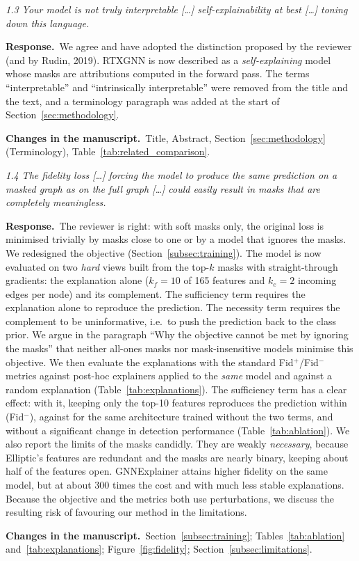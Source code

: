 \documentclass[11pt]{article}
\newenvironment{comment}{\par\medskip\noindent\begin{minipage}{\linewidth}\itshape\color{black!75}}{\end{minipage}\par\smallskip}
\newcommand{\resp}{\par\noindent\textbf{Response.}\ }
\newcommand{\change}{\par\noindent\textbf{Changes in the manuscript.}\ }
\begin{document}
\begin{comment}
1.3 Your model is not truly interpretable [\dots] self-explainability at best [\dots] toning down this language.
\end{comment}
\resp We agree and have adopted the distinction proposed by the reviewer (and by Rudin, 2019). RTXGNN is now described as a \emph{self-explaining} model whose masks are attributions computed in the forward pass. The terms ``interpretable'' and ``intrinsically interpretable'' were removed from the title and the text, and a terminology paragraph was added at the start of Section~\ref{sec:methodology}.
\change Title, Abstract, Section~\ref{sec:methodology} (Terminology), Table~\ref{tab:related_comparison}.

\begin{comment}
1.4 The fidelity loss [\dots] forcing the model to produce the same prediction on a masked graph as on the full graph [\dots] could easily result in masks that are completely meaningless.
\end{comment}
\resp The reviewer is right: with soft masks only, the original loss is minimised trivially by masks close to one or by a model that ignores the masks. We redesigned the objective (Section~\ref{subsec:training}). The model is now evaluated on two \emph{hard} views built from the top-$k$ masks with straight-through gradients: the explanation alone ($k_f=10$ of 165 features and $k_e=2$ incoming edges per node) and its complement. The sufficiency term requires the explanation alone to reproduce the prediction. The necessity term requires the complement to be uninformative, i.e.\ to push the prediction back to the class prior. We argue in the paragraph ``Why the objective cannot be met by ignoring the masks'' that neither all-ones masks nor mask-insensitive models minimise this objective. We then evaluate the explanations with the standard Fid$^{+}$/Fid$^{-}$ metrics against post-hoc explainers applied to the \emph{same} model and against a random explanation (Table~\ref{tab:explanations}). The sufficiency term has a clear effect: with it, keeping only the top-10 features reproduces the prediction within \fidMmask{} (Fid$^-$), against \fidMNofidelitymask{} for the same architecture trained without the two terms, and without a significant change in detection performance (Table~\ref{tab:ablation}). We also report the limits of the masks candidly. They are weakly \emph{necessary}, because Elliptic's features are redundant and the masks are nearly binary, keeping about half of the features open. GNNExplainer attains higher fidelity on the same model, but at about 300 times the cost and with much less stable explanations. Because the objective and the metrics both use perturbations, we discuss the resulting risk of favouring our method in the limitations.
\change Section~\ref{subsec:training}; Tables~\ref{tab:ablation} and~\ref{tab:explanations}; Figure~\ref{fig:fidelity}; Section~\ref{subsec:limitations}.
\end{document}
